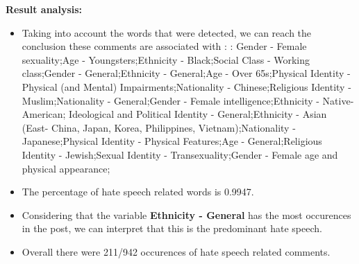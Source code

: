 \documentclass[11pt]{article}
\begin{document}
\textbf{\Large Result analysis:}

\begin{itemize}\item Taking into account the words that were detected, we can reach the conclusion these comments are associated with : : Gender - Female sexuality;Age - Youngsters;Ethnicity - Black;Social Class - Working class;Gender - General;Ethnicity - General;Age - Over 65s;Physical Identity - Physical (and Mental) Impairments;Nationality - Chinese;Religious Identity - Muslim;Nationality - General;Gender - Female intelligence;Ethnicity - Native-American; Ideological and Political Identity - General;Ethnicity - Asian (East- China, Japan, Korea, Philippines, Vietnam);Nationality - Japanese;Physical Identity - Physical Features;Age - General;Religious Identity - Jewish;Sexual Identity - Transexuality;Gender - Female age and physical appearance;%

\item The percentage of hate speech related words is 0.9947.

\item Considering that the variable \textbf{Ethnicity - General} has the most occurences in the post, we can interpret that this is the predominant hate speech.

\item Overall there were 211/942 occurences of hate speech related comments.\end{itemize}
\end{document}
